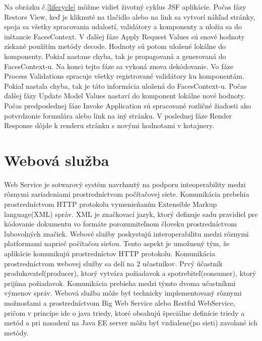 Na obrázku č.\ref{lifecycle} môžme vidieť životný cyklus JSF aplikácie. Počas fázy Restore View, keď je kliknuté na tlačidlo alebo na link sa vytvorí náhľad stránky, spoja sa všetky spracovania udalostí, validátory a komponenty a uložia sa do inštancie FacesContext. V ďalšej fáze Apply Request Values sú snové hodnoty získané použítím metódy decode. Hodnoty sú potom uložené lokálne do komponenty. Pokiaľ nastane chyba, tak je propagovaná a generovaná do FacesContext-u. Na konci tejto fáze sa vykoná znova dekódovanie. Vo fáze Process Validations spracuje všetky registrované validátory ku komponentám. Pokiaľ nastala chyba, tak je táto informácia uložená do FacesContext-u. Počas ďalšej fázy Update Model Values nastaví do komponent lokálne nové hodnoty. Počas predposlednej fáze Invoke Application sú spracované rozličné žiadosti ako potvrdzonie formulára alebo link na iný stránku. V poslednej fáze Render Response dôjde k renderu stránku s novými hodnotami v kotajnery.

\section{Webová služba}\label{webkap}
Web Service je sotwarový systém navrhnutý na podporu inteoperability medzi rôznymi zariadeniami prostredníctvom počítačovej siete\cite{fitweb}. Komunikácia prebehia prostredníctvom HTTP protokolu vymenieňaním Extensible Markup language(XML) správ. XML je značkovací jazyk, ktorý definuje sadu pravidiel pre kódovanie dokumentu vo formáte porozumiteľnom človeku prostredníctvom ľubovolných značiek. Webové služby poskystujú interoperabilitu medzi rôznymi platformami naprieč počítačou sieťou. Tento aspekt je umožnený tým, že aplikácie komunikujú prostredníctov HTTP protokolu. Komunikácia prostredníctvom webovej služby sa delí na 2 učastníkov. Prvý účastník produkovateľ(producer), ktorý vytvára požiadavok a spotrebiteľ(consumer), ktorý prijíma požiadavok. Komunikácia prebieha medzi týmto dvoma učastníkmi výmenov správ. Webová služba môže byť technicky implementovaný rôznymi možnosťami a prostredníctvom Big Web Service alebo Restful WebService, pričom v princípe ide o java triedy, ktoré obsahujú špeciálne definície triedy a metód a pri nasadení na Java EE server môžu byť vzdialene(po sieti) zavolané ich metódy. 



